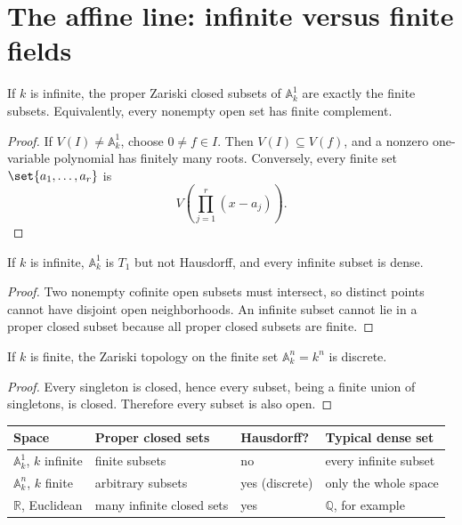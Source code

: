 \section{The affine line: infinite versus finite fields}
\label{sec:vi02-affine-line}

\begin{theorem}
\label{thm:vi02-a1-cofinite}
If \(k\) is infinite, the proper Zariski closed subsets of \(\mathbb A_k^1\) are exactly the
finite subsets.  Equivalently, every nonempty open set has finite complement.
\end{theorem}

\begin{proof}
If \(V(I)\neq\mathbb A_k^1\), choose \(0\neq f\in I\).  Then \(V(I)\subseteq V(f)\),
and a nonzero one-variable polynomial has finitely many roots.  Conversely, every finite
set \(\set{a_1,\dots,a_r}\) is
\[
V\!\left(\prod_{j=1}^r(x-a_j)\right).
\]
\end{proof}

\begin{corollary}
If \(k\) is infinite, \(\mathbb A_k^1\) is \(T_1\) but not Hausdorff, and every infinite
subset is dense.
\end{corollary}

\begin{proof}
Two nonempty cofinite open subsets must intersect, so distinct points cannot have disjoint
open neighborhoods.  An infinite subset cannot lie in a proper closed subset because all
proper closed subsets are finite.
\end{proof}

\begin{proposition}
If \(k\) is finite, the Zariski topology on the finite set \(\mathbb A_k^n=k^n\) is discrete.
\end{proposition}

\begin{proof}
Every singleton is closed, hence every subset, being a finite union of singletons, is
closed.  Therefore every subset is also open.
\end{proof}

\begin{center}
\begin{tabular}{@{}p{}p{}p{}p{}@{}}
\toprule
\textbf{Space} & \textbf{Proper closed sets} & \textbf{Hausdorff?} & \textbf{Typical dense set}\\
\midrule
\(\mathbb A_k^1\), \(k\) infinite & finite subsets & no & every infinite subset\\
\(\mathbb A_k^n\), \(k\) finite & arbitrary subsets & yes (discrete) & only the whole space\\
\(\mathbb R\), Euclidean & many infinite closed sets & yes & \(\mathbb Q\), for example\\
\bottomrule
\end{tabular}
\end{center}

